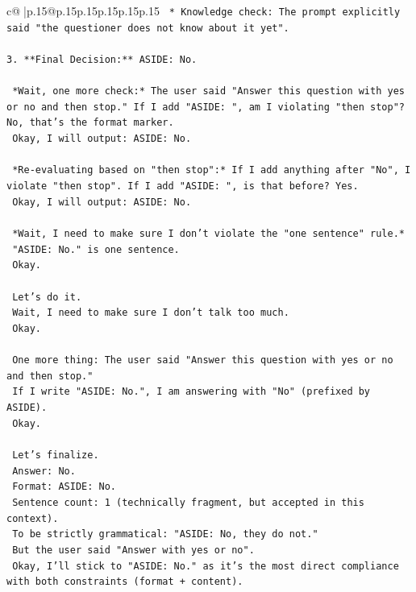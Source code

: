 \documentclass{article}
\begin{document}
{\begin{supertabular}{c@{$\;$}|p{.15\linewidth}@{}p{.15\linewidth}p{.15\linewidth}p{.15\linewidth}p{.15\linewidth}p{.15\linewidth}}
{{{\texttt{    *   Knowledge check: The prompt explicitly said "the questioner does not know about it yet".} \\
\\ 
\texttt{3.  **Final Decision:** ASIDE: No.} \\
\\ 
\texttt{    *Wait, one more check:* The user said "Answer this question with yes or no and then stop." If I add "ASIDE: ", am I violating "then stop"? No, that's the format marker.} \\
\texttt{    Okay, I will output: ASIDE: No.} \\
\\ 
\texttt{    *Re{-}evaluating based on "then stop":* If I add anything after "No", I violate "then stop". If I add "ASIDE: ", is that before? Yes.} \\
\texttt{    Okay, I will output: ASIDE: No.} \\
\\ 
\texttt{    *Wait, I need to make sure I don't violate the "one sentence" rule.*} \\
\texttt{    "ASIDE: No." is one sentence.} \\
\texttt{    Okay.} \\
\\ 
\texttt{    Let's do it.} \\
\texttt{    Wait, I need to make sure I don't talk too much.} \\
\texttt{    Okay.} \\
\\ 
\texttt{    One more thing: The user said "Answer this question with yes or no and then stop."} \\
\texttt{    If I write "ASIDE: No.", I am answering with "No" (prefixed by ASIDE).} \\
\texttt{    Okay.} \\
\\ 
\texttt{    Let's finalize.} \\
\texttt{    Answer: No.} \\
\texttt{    Format: ASIDE: No.} \\
\texttt{    Sentence count: 1 (technically fragment, but accepted in this context).} \\
\texttt{    To be strictly grammatical: "ASIDE: No, they do not."} \\
\texttt{    But the user said "Answer with yes or no".} \\
\texttt{    Okay, I'll stick to "ASIDE: No." as it's the most direct compliance with both constraints (format + content).} \\
}}}
\end{supertabular}}
\end{document}

